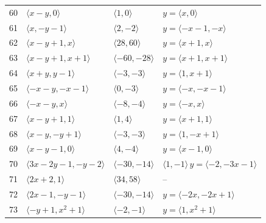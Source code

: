 \documentclass[11pt]{article}
\begin{document}
\begin{longtable}{@{}rlll@{}}
60 & $\langle x-y,0\rangle$ & $\langle 1,0\rangle$ & $y=\langle x,0\rangle$\\
61 & $\langle x,-y-1\rangle$ & $\langle 2,-2\rangle$ & $y=\langle -x-1,-x\rangle$\\
62 & $\langle x-y+1,x\rangle$ & $\langle 28,60\rangle$ & $y=\langle x+1,x\rangle$\\
63 & $\langle x-y+1,x+1\rangle$ & $\langle -60,-28\rangle$ & $y=\langle x+1,x+1\rangle$\\
64 & $\langle x+y,y-1\rangle$ & $\langle -3,-3\rangle$ & $y=\langle 1,x+1\rangle$\\
65 & $\langle -x-y,-x-1\rangle$ & $\langle 0,-3\rangle$ & $y=\langle -x,-x-1\rangle$\\
66 & $\langle -x-y,x\rangle$ & $\langle -8,-4\rangle$ & $y=\langle -x,x\rangle$\\
67 & $\langle x-y+1,1\rangle$ & $\langle 1,4\rangle$ & $y=\langle x+1,1\rangle$\\
68 & $\langle x-y,-y+1\rangle$ & $\langle -3,-3\rangle$ & $y=\langle 1,-x+1\rangle$\\
69 & $\langle x-y-1,0\rangle$ & $\langle 4,-4\rangle$ & $y=\langle x-1,0\rangle$\\
70 & $\langle 3x-2y-1,-y-2\rangle$ & $\langle -30,-14\rangle$ & $\langle 1,-1\rangle\,y=\langle -2,-3x-1\rangle$\\
71 & $\langle 2x+2,1\rangle$ & $\langle 34,58\rangle$ & --\\
72 & $\langle 2x-1,-y-1\rangle$ & $\langle -30,-14\rangle$ & $y=\langle -2x,-2x+1\rangle$\\
73 & $\langle -y+1,x^{2}+1\rangle$ & $\langle -2,-1\rangle$ & $y=\langle 1,x^{2}+1\rangle$\\
\end{longtable}
\endgroup
\end{document}
